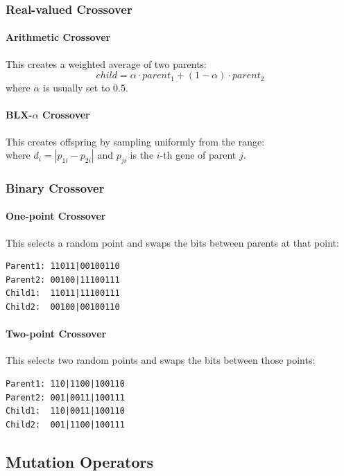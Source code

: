 \documentclass{article}
\begin{document}
\subsubsection{Real-valued Crossover}
\paragraph{Arithmetic Crossover}
This creates a weighted average of two parents:
\begin{equation}
child = \alpha \cdot parent_1 + (1-\alpha) \cdot parent_2
\end{equation}
where $\alpha$ is usually set to 0.5.

\paragraph{BLX-$\alpha$ Crossover}
This creates offspring by sampling uniformly from the range:
\begin{equation}
[min(p_{1i}, p_{2i}) - \alpha \cdot d_i, max(p_{1i}, p_{2i}) + \alpha \cdot d_i]
\end{equation}
where $d_i = |p_{1i} - p_{2i}|$ and $p_{ji}$ is the $i$-th gene of parent $j$.

\subsubsection{Binary Crossover}
\paragraph{One-point Crossover}
This selects a random point and swaps the bits between parents at that point:
\begin{verbatim}
Parent1: 11011|00100110
Parent2: 00100|11100111
Child1:  11011|11100111
Child2:  00100|00100110
\end{verbatim}

\paragraph{Two-point Crossover}
This selects two random points and swaps the bits between those points:
\begin{verbatim}
Parent1: 110|1100|100110
Parent2: 001|0011|100111
Child1:  110|0011|100110
Child2:  001|1100|100111
\end{verbatim}

\subsection{Mutation Operators}
\end{document}
